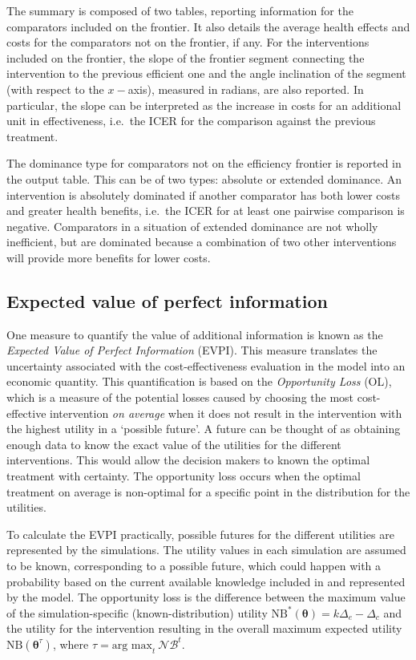 \documentclass[]{article}
\begin{document}
The summary is composed of two tables, reporting information for the
comparators included on the frontier. It also details the average health
effects and costs for the comparators not on the frontier, if any. For
the interventions included on the frontier, the slope of the frontier
segment connecting the intervention to the previous efficient one and
the angle inclination of the segment (with respect to the \(x-\)axis),
measured in radians, are also reported. In particular, the slope can be
interpreted as the increase in costs for an additional unit in
effectiveness, i.e.~the ICER for the comparison against the previous
treatment.

The dominance type for comparators not on the efficiency frontier is
reported in the output table. This can be of two types: absolute or
extended dominance. An intervention is absolutely dominated if another
comparator has both lower costs and greater health benefits, i.e.~the
ICER for at least one pairwise comparison is negative. Comparators in a
situation of extended dominance are not wholly inefficient, but are
dominated because a combination of two other interventions will provide
more benefits for lower costs.

\hypertarget{expected-value-of-perfect-information}{%
\subsection{Expected value of perfect
information}\label{expected-value-of-perfect-information}}

One measure to quantify the value of additional information is known as
the \emph{Expected Value of Perfect Information} (EVPI). This measure
translates the uncertainty associated with the cost-effectiveness
evaluation in the model into an economic quantity. This quantification
is based on the \emph{Opportunity Loss} (OL), which is a measure of the
potential losses caused by choosing the most cost-effective intervention
\emph{on average} when it does not result in the intervention with the
highest utility in a `possible future'. A future can be thought of as
obtaining enough data to know the exact value of the utilities for the
different interventions. This would allow the decision makers to known
the optimal treatment with certainty. The opportunity loss occurs when
the optimal treatment on average is non-optimal for a specific point in
the distribution for the utilities.

To calculate the EVPI practically, possible futures for the different
utilities are represented by the simulations. The utility values in each
simulation are assumed to be known, corresponding to a possible future,
which could happen with a probability based on the current available
knowledge included in and represented by the model. The opportunity loss
is the difference between the maximum value of the simulation-specific
(known-distribution) utility
\(\mbox{NB}^*(\bm\theta)=k\Delta_e-\Delta_c\) and the utility for the
intervention resulting in the overall maximum expected utility
\(\mbox{NB}(\bm\theta^\tau)\), where
\(\tau=\text{arg max}_t ~\mathcal{NB}^t\).
\end{document}
